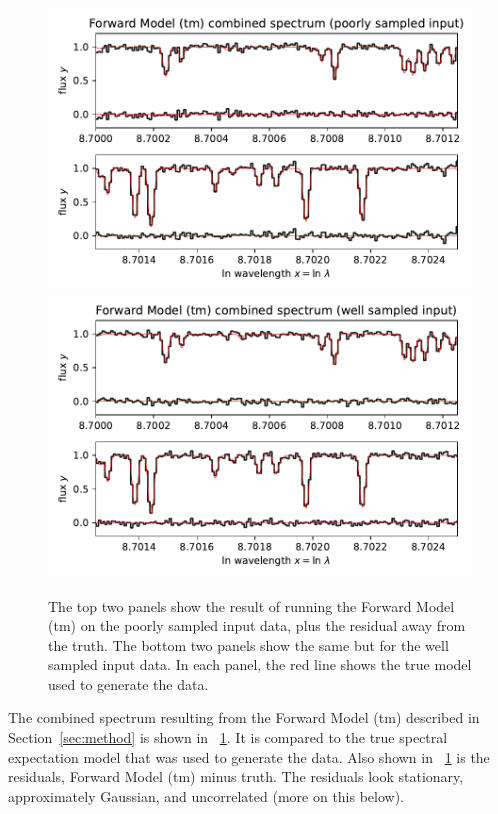 \documentclass[modern]{aastex631}
\newlength{\figurewidth}
\newcommand{\sectionname}{Section}
\begin{document}
\begin{figure}[t!]
    \begin{mdframed}\begin{center}
    \includegraphics[width=\figurewidth]{notebooks/forward1.pdf}\\
    \includegraphics[width=\figurewidth]{notebooks/forward2.pdf}
    \end{center}
    \caption{The top two panels show the result of running the Forward Model (tm) on the poorly sampled input data, plus the residual away from the truth. The bottom two panels show the same but for the well sampled input data. In each panel, the red line shows the true model used to generate the data.\label{fig:forward}}
    \end{mdframed}
\end{figure}
The combined spectrum resulting from the Forward Model (tm) described in \sectionname~\ref{sec:method} is shown in \figurename~\ref{fig:forward}.
It is compared to the true spectral expectation model that was used to generate the data.
Also shown in \figurename~\ref{fig:forward} is the residuals, Forward Model (tm) minus truth.
The residuals look stationary, approximately Gaussian, and uncorrelated (more on this below).
\end{document}
